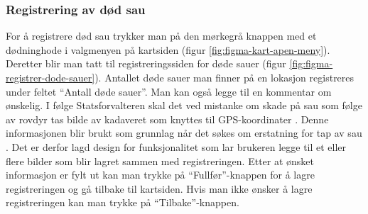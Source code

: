 \subsubsection{Registrering av død sau}
For å registrere død sau trykker man på den mørkegrå knappen med et dødninghode i valgmenyen på kartsiden (figur \ref{fig:figma-kart-apen-meny}). Deretter blir man tatt til registreringssiden for døde sauer (figur \ref{fig:figma-registrer-dode-sauer}). Antallet døde sauer man finner på en lokasjon registreres under feltet \enquote{Antall døde sauer}. Man kan også legge til en kommentar om ønskelig. I følge Statsforvalteren skal det ved mistanke om skade på sau som følge av rovdyr tas bilde av kadaveret som knyttes til GPS-koordinater \cite[~s.19]{StatsforvaltereniInnlandet2020InformasjonInnlandet}. Denne informasjonen blir brukt som grunnlag når det søkes om erstatning for tap av sau \cite{2014ForskriftRovvilt, MiljdirektoratetErstatningRovvilt}. Det er derfor lagd design for funksjonalitet som lar brukeren legge til et eller flere bilder som blir lagret sammen med registreringen. Etter at ønsket informasjon er fylt ut kan man trykke på \enquote{Fullfør}-knappen for å lagre registreringen og gå tilbake til kartsiden. Hvis man ikke ønsker å lagre registreringen kan man trykke på \enquote{Tilbake}-knappen.
